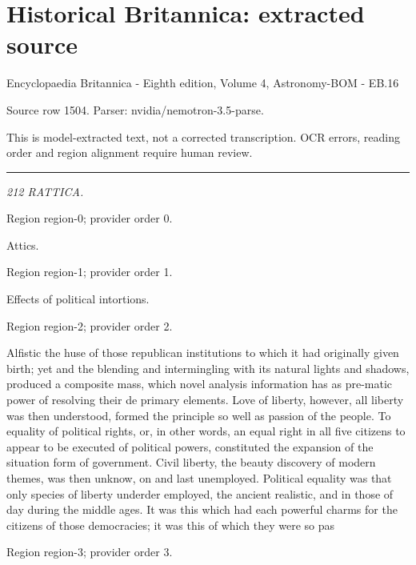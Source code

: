 \documentclass[11pt]{article}
\begin{document}
\section*{Historical Britannica: extracted source}
Encyclopaedia Britannica - Eighth edition, Volume 4, Astronomy-BOM - EB.16\par
{\small Source row 1504. Parser: nvidia/nemotron-3.5-parse.\par}
{\small This is model-extracted text, not a corrected transcription. OCR errors, reading order and region alignment require human review.\par}
\hrule\medskip
{\small\itshape 212 RATTICA.\par}

{\scriptsize\color{gray} Region region-0; provider order 0.\par}
\medskip

Attics.
\par

{\scriptsize\color{gray} Region region-1; provider order 1.\par}
\medskip

Effects of political intortions.
\par

{\scriptsize\color{gray} Region region-2; provider order 2.\par}
\medskip

Alfistic the huse of those republican institutions to which it had originally given birth; yet and the blending and intermingling with its natural lights and shadows, produced a composite mass, which novel analysis information has as pre-matic power of resolving their de primary elements. Love of liberty, however, all liberty was then understood, formed the principle so well as passion of the people. To equality of political rights, or, in other words, an equal right in all five citizens to appear to be executed of political powers, constituted the expansion of the situation form of government. Civil liberty, the beauty discovery of modern themes, was then unknow, on and last unemployed. Political equality was that only species of liberty underder employed, the ancient realistic, and in those of day during the middle ages. It was this which had each powerful charms for the citizens of those democracies; it was this of which they were so pas
\par

{\scriptsize\color{gray} Region region-3; provider order 3.\par}
\medskip
\end{document}
